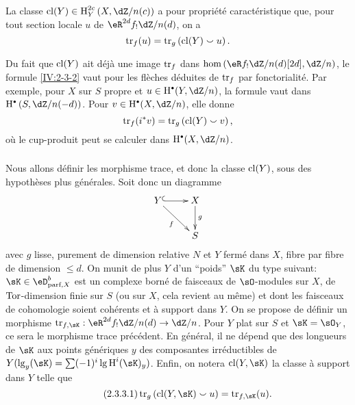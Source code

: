 \begin{definition}\label{IV:2-3-2}
La classe $\cl(Y)\in\h_Y^{2 c}\left(X,\dZ/n(c)\right)$ a pour propriété 
caractéristique que, pour tout section locale $u$ de $\eR^{2 d}f_! \dZ/n(d)$, 
on a 
\[
  \operatorname{tr}_f(u) = \operatorname{tr}_g\left(\operatorname{cl}(Y)\smallsmile u\right) \text{.}
\]
\end{definition}

Du fait que $\operatorname{cl}(Y)$ ait déjà une image $\operatorname{tr}_f$ dans 
$\hom\left(\eR f_!\dZ/n(d)[2 d],\dZ/n\right)$, le formule \ref{IV:2-3-2} vaut 
pour les flèches déduites de $\operatorname{tr}_f$ par fonctorialité. Par exemple, 
pour $X$ sur $S$ propre et $u\in \h^\bullet(Y,\dZ/n)$, la formule vaut dans 
$\h^\bullet\left(S,\dZ/n(-d)\right)$. Pour $v\in \h^\bullet(X,\dZ/n)$, elle 
donne 
\[
  \operatorname{tr}_f(i^* v) = \operatorname{tr}_g\left(\operatorname{cl}(Y)\smallsmile v\right) \text{,}
\]
où le cup-produit peut se calculer dans $\h^\bullet(X,\dZ/n)$. 





\subsubsection{}\label{IV:2-3-3}

Nous allons définir les morphisme trace, et donc la classe $\operatorname{cl}(Y)$, sous des 
hypothèses plus générales. Soit donc un diagramme 
\[\xymatrix{
  Y \ar@{^{(}->}[r] \ar[dr]_-f 
    & X \ar[d]^-g \\
  & S
}\]
avec $g$ lisse, purement de dimension relative $N$ et $Y$ fermé dans $X$, 
fibre par fibre de dimension $\leqslant d$. On munit de plus $Y$ d'un 
``poids'' $\sK$ du type suivant: $\sK\in\eD_{\text{parf},X}^b$ est un 
complexe borné de faisceaux de $\sO$-modules sur $X$, de $\operatorname{Tor}$-dimension 
finie sur $S$ (ou sur $X$, cela revient au même) et dont les faisceaux de 
cohomologie soient cohérents et à support dans $Y$. On se propose de 
définir un morphisme $\tr_{f,\sK}:\eR^{2 d}f_! \dZ/n(d) \to \dZ/n$. Pour $Y$ 
plat sur $S$ et $\sK=\sO_Y$, ce sera le morphisme trace précédent. En 
général, il ne dépend que des longueurs de $\sK$ aux points 
génériques $y$ des composantes irréductibles de 
$Y(\operatorname{lg}_y(\sK) = \sum (-1)^i \operatorname{lg} \h^i(\sK)_y)$. 
Enfin, on notera $\cl(Y,\sK)$ la classe à support dans $Y$ telle que 
\begin{equation*}\tag{2.3.3.1}\label{IV:eq:2-3-3-1}
  \tr_g\left(\cl(Y,\sK)\smallsmile u\right) = \tr_{f,\sK}(u) \text{.}
\end{equation*}





